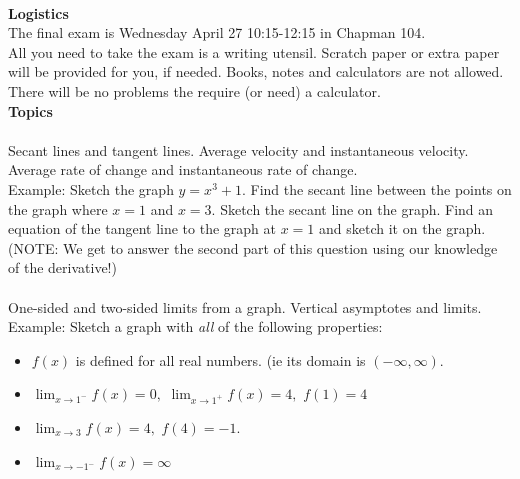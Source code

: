 \documentclass[11pt,fleqn]{article}
\begin{document}
\renewcommand{\headrulewidth}{0pt}
\newcommand{\blank}[1]{\rule{#1}{0.75pt}}
\newcommand{\bc}{\begin{center}}
\newcommand{\ec}{\end{center}}
\renewcommand{\d}{\displaystyle}

\vspace*{-0.7in}

\begin{center}
  \large
  \\
\end{center}
\noindent\textbf{Logistics}\\

The final exam is Wednesday April 27 10:15-12:15 in Chapman 104. \\

All you need to take the exam is a writing utensil. Scratch paper or extra paper will be provided for you, if needed. Books, notes and calculators are not allowed. There will be no problems the require (or need) a calculator. \\

\noindent\textbf{Topics}\\

\noindent {}\\
Secant lines and tangent lines. Average velocity and instantaneous velocity. Average rate of change and instantaneous rate of change.\\

Example: Sketch the graph $y=x^3+1.$ Find the secant line between the points on the graph where $x=1$ and $x=3.$ Sketch  the secant line on the graph. Find an equation of the tangent line to the graph at $x=1$ and sketch it on the graph. (NOTE: We get to answer the second part of this question using our knowledge of the derivative!) \\

\noindent {}\\
One-sided and two-sided limits from a graph. Vertical asymptotes and limits.\\

Example: Sketch a graph with \emph{all} of the following properties: \\
\begin{itemize}
\item $f(x)$ is defined for all real numbers. (ie its domain is $(-\infty,\infty).$
\item $\lim_{x \to 1^-} f(x) = 0,$ $\lim_{x \to 1^+} f(x) =4,$ $f(1) =4$
\item $\lim_{x \to 3} f(x) =4,$ $f(4)=-1.$
\item $\lim_{x \to -1^-} f(x) =\infty$
\end{itemize}
\end{document}
